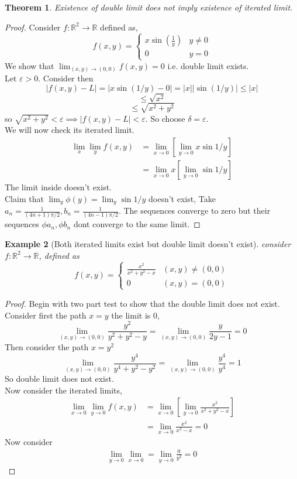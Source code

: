 \documentclass[oneside,11pt,pdftex]{book}%
\numberwithin{equation}{section}
\newtheorem{theorem}{Theorem}[chapter]%
\newtheorem{example}[theorem]{Example}
\numberwithin{section}{chapter}
\numberwithin{equation}{chapter}
\newcommand{\R}{\mathbb{R}}
\begin{document}
\begin{theorem}
	Existence of double limit does not imply existence of iterated limit.
\end{theorem}
\begin{proof}
	Consider $ f:\R^2 \rightarrow \R  $ defined as,
	\[ f(x,y)=\begin{cases}
		x \sin \left(\frac{1}{y}\right) & y \neq 0\\
		0 & y=0
	\end{cases} \]
We show that $ \lim_{(x,y)\rightarrow (0,0)} f(x,y)=0$ i.e. double limit exists.\\
Let $ \varepsilon>0 $. Consider then
\[ |f(x,y)-L|=\left|x \sin (1/y)-0\right| = |x| \left|\sin (1/y)\right| \leq |x| \]
\[ \leq \sqrt{x^2} \]
\[ \leq \sqrt{x^2+y^2} \]
so $ \sqrt{x^2+y^2} < \varepsilon \implies |f(x,y)-L| < \varepsilon$. So choose $ \delta=\varepsilon. $\\
We will now check its iterated limit.
\begin{align*}
	\lim_x \lim_y f(x,y)&= \lim_{x \rightarrow 0} \left[\lim_{y \rightarrow 0}x \sin 1/y \right]\\
	&= \lim_{x \rightarrow 0}x \left[\lim_{y \rightarrow 0} \sin 1/y \right]
\end{align*}
The limit inside doesn't exist.\\
Claim that $ \lim_y \phi(y)=\lim_y \sin 1/y $ doesn't exist,
Take $ a_n=\frac{1}{(4n+1)\pi/2}, b_n=\frac{1}{(4n-1)\pi/2}$.
The sequences converge to zero but their sequences $ \phi a_n, \phi b_n $ dont converge to the same limit.
\end{proof}

\begin{example}[Both iterated limits exist but double limit doesn't exist]
	consider $ f: \R^2 \rightarrow \R  $, defined as 
	\[ f(x,y)=\begin{cases}
		\frac{x^2}{x^2+y^2-x} & (x,y)\neq (0,0)\\
		0 & (x,y)=(0,0)
	\end{cases} \]
\end{example}
\begin{proof}
	Begin with two part test to show that the double limit does not exist.\\
	Consider first the path $ x=y $ the limit is $ 0 $,
	\[ \lim\limits_{(x,y)\to(0,0)}\frac{y^2}{y^2+y^2-y}=\lim\limits_{(x,y)\to(0,0)}\frac{y}{2y-1}=0 \]
	Then consider the path $ x=y^2 $
	\[ \lim\limits_{(x,y)\to(0,0)}\frac{y^4}{y^4+y^2-y^2}=\lim\limits_{(x,y)\to(0,0)}\frac{y^4}{y^4}=1 \]
	So double limit does not exist. \\
	Now consider the iterated limits,
	\begin{align*}
		\lim_{x\rightarrow 0} \lim_{y \rightarrow 0} f(x,y) &= \lim_{x \rightarrow 0} \left[\lim_{y \rightarrow 0} \frac{x^2}{x^2+y^2-x}\right]\\
		&=\lim_{x\rightarrow 0} \frac{x^2}{x^2-x}=0
	\end{align*}
Now consider 
\begin{align*}
	\lim_{y \rightarrow 0} \lim_{x \rightarrow 0} = \lim_{y \rightarrow 0} \frac{0}{y^2}=0
\end{align*}
\end{proof}
\end{document}
